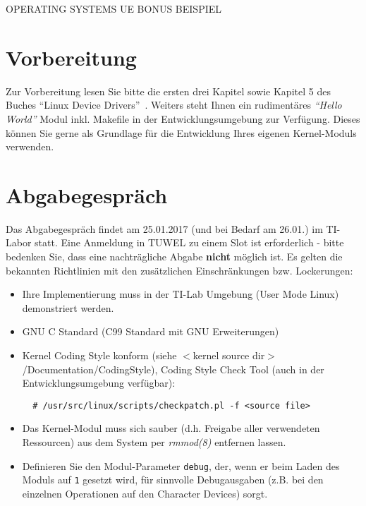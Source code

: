 \documentclass{article}
\begin{document}
\begin{center}
\begin{Large}
OPERATING SYSTEMS UE BONUS BEISPIEL
\end{Large}
\end{center}


\section*{Vorbereitung}
Zur Vorbereitung lesen Sie bitte die ersten drei Kapitel sowie Kapitel
5 des Buches "`Linux Device
Drivers"'~\cite{Corbet:2005:LDD:1209083}. Weiters steht Ihnen ein
rudiment{\"a}res \emph{"`Hello World"'} Modul inkl. Makefile in
der Entwicklungsumgebung zur Verf{\"u}gung. Dieses k{\"o}nnen Sie gerne als
Grundlage f{\"u}r die Entwicklung Ihres eigenen Kernel-Moduls
verwenden.

\section*{Abgabegespr{\"a}ch}
Das Abgabegespr{\"a}ch findet am 25.01.2017 (und bei Bedarf am 26.01.) im TI-Labor statt.
Eine Anmeldung in TUWEL zu einem Slot ist erforderlich -
bitte bedenken Sie, dass eine nachtr{\"a}gliche Abgabe {\bf nicht}
m{\"o}glich ist. Es gelten die
bekannten Richtlinien mit den zus{\"a}tzlichen Einschr{\"a}nkungen
bzw. Lockerungen:
\begin{itemize}
\item Ihre Implementierung muss in der TI-Lab Umgebung (User Mode Linux) demonstriert werden.
\item GNU C Standard (C99 Standard mit GNU Erweiterungen)
\item Kernel Coding Style konform (siehe $<$kernel source
  dir$>$/Documentation/CodingStyle), Coding Style Check Tool
  (auch in der Entwicklungsumgebung verf{\"u}gbar):
  \begin{verbatim}
  # /usr/src/linux/scripts/checkpatch.pl -f <source file>
  \end{verbatim}
\item Das Kernel-Modul muss sich sauber (d.h. Freigabe aller
  verwendeten Ressourcen) aus dem System per \emph{rmmod(8)} entfernen lassen.
\item Definieren Sie den Modul-Parameter \verb|debug|, der, wenn er beim Laden des Moduls auf \texttt{1} gesetzt wird, f{\"u}r sinnvolle Debugausgaben (z.B. bei den einzelnen Operationen auf den Character Devices) sorgt.
\end{itemize}
\end{document}
